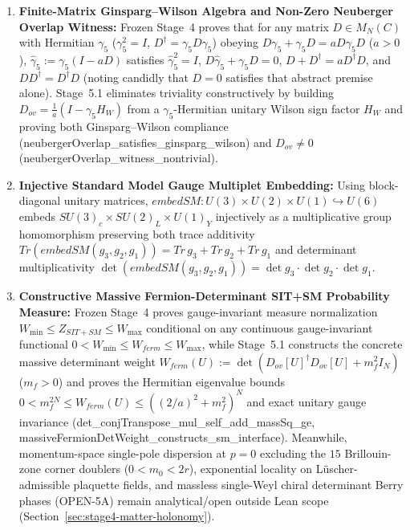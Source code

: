 \documentclass[american,11pt,letterpaper]{article}
\def\mathbb#1{#1}%
\def\mathrm#1{#1}%
\def\texttt#1{#1}%
\begin{document}
\begin{enumerate}[leftmargin=2em]
  \item \textbf{Finite-Matrix Ginsparg--Wilson Algebra and Non-Zero Neuberger Overlap Witness:} Frozen Stage~4 proves that for any matrix $D \in M_N(\mathbb{C})$ with Hermitian $\gamma_5$ ($\gamma_5^2 = I$, $D^\dagger = \gamma_5 D \gamma_5$) obeying $D\gamma_5 + \gamma_5 D = a D\gamma_5 D$ ($a > 0$), $\hat{\gamma}_5 := \gamma_5(I - a D)$ satisfies $\hat{\gamma}_5^2 = I$, $D\hat{\gamma}_5 + \gamma_5 D = 0$, $D + D^\dagger = a D^\dagger D$, and $D D^\dagger = D^\dagger D$ (noting candidly that $D = 0$ satisfies that abstract premise alone). Stage~5.1 eliminates triviality constructively by building $D_{\mathrm{ov}} = \frac{1}{a}(I - \gamma_5 H_W)$ from a $\gamma_5$-Hermitian unitary Wilson sign factor $H_W$ and proving both Ginsparg--Wilson compliance (\texttt{neuberger\allowbreak{}Overlap\_\allowbreak{}satisfies\_\allowbreak{}ginsparg\_\allowbreak{}wilson}) and $D_{\mathrm{ov}} \ne 0$ (\texttt{neuberger\allowbreak{}Overlap\_\allowbreak{}witness\_\allowbreak{}nontrivial}).
  \item \textbf{Injective Standard Model Gauge Multiplet Embedding:} Using block-diagonal unitary matrices, $\mathrm{embedSM} : U(3) \times U(2) \times U(1) \hookrightarrow U(6)$ embeds $SU(3)_c \times SU(2)_L \times U(1)_Y$ injectively as a multiplicative group homomorphism preserving both trace additivity $\mathrm{Tr}(\mathrm{embedSM}(g_3,g_2,g_1)) = \mathrm{Tr}\,g_3 + \mathrm{Tr}\,g_2 + \mathrm{Tr}\,g_1$ and determinant multiplicativity $\det(\mathrm{embedSM}(g_3,g_2,g_1)) = \det g_3 \cdot \det g_2 \cdot \det g_1$.
  \item \textbf{Constructive Massive Fermion-Determinant SIT+SM Probability Measure:} Frozen Stage~4 proves gauge-invariant measure normalization $W_{\min} \le Z_{\mathrm{SIT+SM}} \le W_{\max}$ conditional on any continuous gauge-invariant functional $0 < W_{\min} \le W_{\mathrm{ferm}} \le W_{\max}$, while Stage~5.1 constructs the concrete massive determinant weight $W_{\mathrm{ferm}}(U) := \det(D_{\mathrm{ov}}[U]^\dagger D_{\mathrm{ov}}[U] + m_f^2 I_N)$ ($m_f > 0$) and proves the Hermitian eigenvalue bounds $0 < m_f^{2N} \le W_{\mathrm{ferm}}(U) \le ((2/a)^2 + m_f^2)^N$ and exact unitary gauge invariance (\texttt{det\_\allowbreak{}conj\allowbreak{}Transpose\_\allowbreak{}mul\_\allowbreak{}self\_\allowbreak{}add\_\allowbreak{}mass\allowbreak{}Sq\_\allowbreak{}ge}, \texttt{massive\allowbreak{}Fermion\allowbreak{}Det\allowbreak{}Weight\_\allowbreak{}constructs\_\allowbreak{}sm\_\allowbreak{}interface}). Meanwhile, momentum-space single-pole dispersion at $p = 0$ excluding the $15$ Brillouin-zone corner doublers ($0 < m_0 < 2r$), exponential locality on L\"uscher-admissible plaquette fields, and massless single-Weyl chiral determinant Berry phases (\texttt{OPEN-5A}) remain analytical/open outside Lean scope (Section~\ref{sec:stage4-matter-holonomy}).
\end{enumerate}
\end{document}
